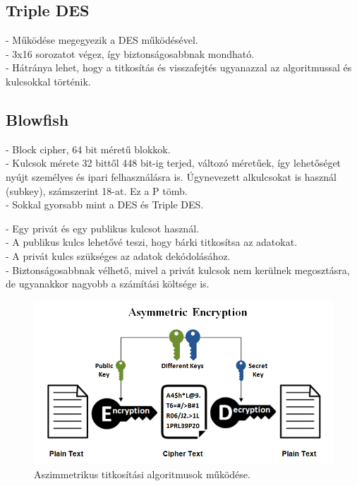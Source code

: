 \subsection{Triple DES}
\noindent- Működése megegyezik a DES működésével.
\vspace{5pt}\\- 3x16 sorozatot végez, így biztonságosabbnak mondható.
\vspace{5pt}\\- Hátránya lehet, hogy a titkosítás és visszafejtés ugyanazzal az algoritmussal és kulcsokkal történik.



\subsection{Blowfish}
\noindent - Block cipher, 64 bit méretű blokkok.
\vspace{5pt}\\- Kulcsok mérete 32 bittől 448 bit-ig terjed, változó méretűek, így lehetőséget nyújt személyes és ipari felhasználásra is. Úgynevezett alkulcsokat is használ (subkey), számszerint 18-at. Ez a P tömb.
\vspace{5pt}\\- Sokkal gyorsabb mint a DES és Triple DES.









\newpage {}
\noindent - Egy privát és egy publikus kulcsot használ.
\vspace{5pt} \\- A publikus kulcs lehetővé teszi, hogy bárki titkosítsa az adatokat.
\vspace{5pt} \\- A privát kulcs szükséges az adatok  dekódolásához. 
\vspace{5pt} \\- Biztonságosabbnak vélhető, mivel a privát kulcsok nem kerülnek megosztásra, de ugyanakkor nagyobb a számítási költsége is.\newline

\begin{figure}[h]
	\centering
	\includegraphics[scale=0.4]{images/asym.png}
	\caption{Aszimmetrikus titkosítási algoritmusok működése.}
	\label{fig:asym_encryptino}
\end{figure}

